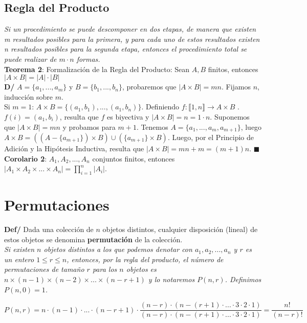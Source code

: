 \documentclass[11pt,a4paper]{article}
\newcommand*{\QEDA}{\null\nobreak\hfill\ensuremath{\blacksquare}}
\begin{document}
\subsection{Regla del Producto}
\textit{Si un procedimiento se puede descomponer en dos etapas, de manera que existen m resultados posibles para la primera, y para cada uno de estos resultados existen n resultados posibles para la segunda etapa, entonces el procedimiento total se puede realizar de $m \cdot n$ formas.}\\

\textbf{Teorema 2}: Formalizaci\'on de la Regla del Producto: Sean $A,B$ finitos, entonces $|A \times B| = |A|\cdot|B|$\\
\textbf{D/} $A=\{a_1,...,a_m\}$ y $B=\{b_1,...,b_n\}$, probaremos que $|A \times B| = mn$. Fijamos $n$, inducci\'on sobre $m$. \\
Si $m=1$: $A \times B = \{(a_1,b_1),...,(a_1, b_n)\}$. Definiendo $f : \llbracket 1, n \rrbracket \rightarrow A \times B$ . $f(i) = (a_1, b_i)$, resulta que $f$ es biyectiva y $|A \times B| = n = 1 \cdot n$. Suponemos que $|A \times B| = mn$ y probamos para $m+1$. Tenemos $A = \{a_1, ..., a_m, a_{m+1}\}$, luego $A \times B = ((A - \{a_{m+1}\}) \times B) \cup (\{a_{m+1}\} \times B)$. Luego, por el Principio de Adici\'on y la Hip\'otesis Inductiva, resulta que $|A \times B| = mn + m = (m+1)n$. \QEDA\\

\textbf{Corolario 2}: $A_1, A_2, ..., A_n$ conjuntos finitos, entonces $|A_1 \times A_2 \times ... \times A_n| = \prod_{i=1}^n |A_i|$.\\

\section{Permutaciones}
\textbf{Def/} Dada una colección de $n$ objetos distintos, cualquier disposición (lineal) de estos objetos se denomina \textbf{permutación} de la colección.\\

\textit{Si existen $n$ objetos distintos a los que podemos denotar con $a_1, a_2, ..., a_n$ y $r$ es un entero $1 \leq r \leq n$, entonces, por la regla del producto, el número de permutaciones de tamaño $r$ para los $n$ objetos es $n \times (n-1) \times (n-2) \times ... \times (n-r+1)$ y lo notaremos $P(n,r)$. Definimos $P(n,0)=1$.}

$$P(n,r) = n\cdot (n-1)\cdot...\cdot(n-r+1) \cdot \dfrac{(n-r)\cdot(n-(r+1)\cdot...\cdot3\cdot2\cdot1)}{(n-r)\cdot(n-(r+1)\cdot...\cdot3\cdot2\cdot1)} = \dfrac{n!}{(n-r)!}$$
\end{document}
